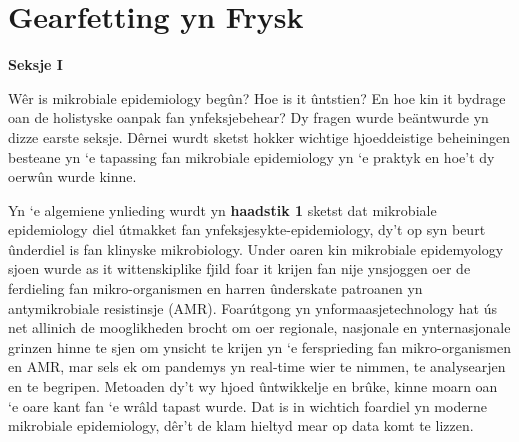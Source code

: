 \documentclass[
]{book}
\begin{document}
\hypertarget{gearfetting-yn-frysk}{%
\chapter*{Gearfetting yn Frysk}\label{gearfetting-yn-frysk}}

\textbf{Seksje I}

Wêr is mikrobiale epidemiology begûn? Hoe is it ûntstien? En hoe kin it bydrage oan de holistyske oanpak fan ynfeksjebehear? Dy fragen wurde beäntwurde yn dizze earste seksje. Dêrnei wurdt sketst hokker wichtige hjoeddeistige beheiningen besteane yn `e tapassing fan mikrobiale epidemiology yn `e praktyk en hoe't dy oerwûn wurde kinne.

Yn `e algemiene ynlieding wurdt yn \textbf{haadstik 1} sketst dat mikrobiale epidemiology diel útmakket fan ynfeksjesykte-epidemiology, dy't op syn beurt ûnderdiel is fan klinyske mikrobiology. Under oaren kin mikrobiale epidemyology sjoen wurde as it wittenskiplike fjild foar it krijen fan nije ynsjoggen oer de ferdieling fan mikro-organismen en harren ûnderskate patroanen yn antymikrobiale resistinsje (AMR). Foarútgong yn ynformaasjetechnology hat ús net allinich de mooglikheden brocht om oer regionale, nasjonale en ynternasjonale grinzen hinne te sjen om ynsicht te krijen yn `e fersprieding fan mikro-organismen en AMR, mar sels ek om pandemys yn real-time wier te nimmen, te analysearjen en te begripen. Metoaden dy't wy hjoed ûntwikkelje en brûke, kinne moarn oan `e oare kant fan `e wrâld tapast wurde. Dat is in wichtich foardiel yn moderne mikrobiale epidemiology, dêr't de klam hieltyd mear op data komt te lizzen.
\end{document}
